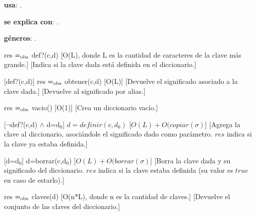 \begin{Interfaz}
  
  \textbf{usa}: \tadNombre{}.
  
  \textbf{se explica con}: .
  
  \textbf{g\'eneros}: .


  {res $=_{\mathrm{obs}}$ def?(c,d)}
  [O(L), donde L es la cantidad de caracteres de la clave m\'as grande.]
  [Indica si la clave dada est\'a definida en el diccionario.]

  [def?(c,d)]
  {res $=_{\mathrm{obs}}$ obtener(c,d)}
  [O(L)]
  [Devuelve el significado asociado a la clave dada.]
  [Devuelve al significado por alias.]
  
  {res $=_{\mathrm{obs}}$ vacio()}
  [O(1)]
  [Crea un diccionario vac\'io.]
  
  [$\neg$def?(c,d) $\wedge$ d=d$_0$]
  {$d = definir(c,d_0)$}
  [$O(L)+O(copiar(\sigma)$]
  [Agrega la clave al diccionario, asoci\'andole el significado dado como par\'ametro. $res$ indica si la clave ya estaba definida.]
  
  [d=d$_0$]
  {d=borrar(c,d$_0$)}
  [$O(L)+O(borrar(\sigma)$]
  [Borra la clave dada y su significado del diccionario. $res$ indica si la clave estaba definida (su valor es $true$ en caso de estarlo).]
  
  {res $=_{\mathrm{obs}}$ claves(d)}
  [O(n*L), donde n es la cantidad de claves.]
  [Devuelve el conjunto de las claves del diccionario.]

\end{Interfaz}
